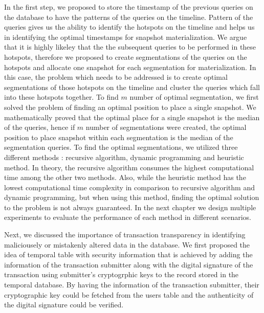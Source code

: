 		In the first step, we proposed to store the timestamp of the previous queries on the database to have the patterns of the queries on the timeline. Pattern of the queries gives us the ability to identify the hotspots on the timeline and helps us in identifying the optimal timestamps for snapshot materialization. We argue that it is highly likeley that the the subsequent queries to be performed in these hotspots, therefore we proposed to create segmentations of the queries on the hotspots and allocate one snapshot for each segmentation for materialization. In this case, the problem which needs to be addressed is to create optimal segmentations of those hotspots on the timeline and cluster the queries which fall into these hotspots together.
		To find $m$ number of optimal segmentation, we first solved the problem of finding an optimal position to place a single snapshot. We mathematically proved that the optimal place for a single snapshot is the median of the queries, hence if $m$ number of segmentations were created, the optimal position to place snapshot within each segmentation is the median of the segmentation queries. To find the optimal segmentations, we utilized three different methods : recursive algorithm, dynamic programming and heuristic method. In theory, the recursive algorithm consumes the highest computational time among the other two methods. Also, while the heuristic method has the lowest computational time complexity in comparison to recursive algorithm and dynamic programming, but when using this method, finding the optimal solution to the problem is not always guaranteed. In the next chapter we design multiple experiments to evaluate the performance of each method in different scenarios.

		Next, we discussed the importance of transaction transparency in identifying maliciousely or mistakenly altered data in the database. We first proposed the idea of temporal table with security information that is achieved by adding the information of the transaction submitter along with the digital signature of the transaction using submitter's cryptogrphic keys to the record stored in the temporal database. By having the information of the transaction submitter, their cryptographic key could be fetched from the users table and the authenticity of the digital signature could be verified.

